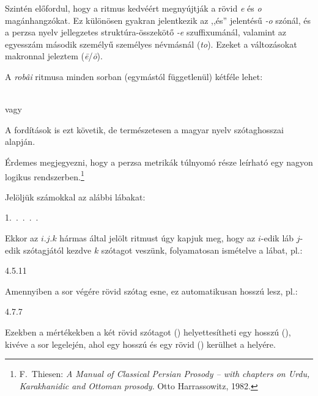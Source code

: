 Szintén előfordul, hogy a ritmus kedvéért megnyújtják a rövid \emph{e}
és \emph{o} magánhangzókat. Ez különösen gyakran jelentkezik az ,,és''
jelentésű \emph{-o} szónál, és a perzsa nyelv jellegzetes
struktúra-összekötő \emph{-e} szuffixumánál, valamint az egyesszám
második személyű személyes névmásnál (\emph{to}). Ezeket a
változásokat makronnal jeleztem (\emph{ē}/\emph{ō}).

A \emph{robâi} ritmusa minden sorban (egymástól függetlenül) kétféle
lehet:
\begin{center}
  {\large\metra{\m\m\mbb\s\m\m\mbb\s\m\m\mbb\s\m\cc}}\\
  vagy\\
  {\large\metra{\m\m\mbb\s\m\b\m\b\s\m\m\mbb\s\m\cc}}
\end{center}

A fordítások is ezt követik, de természetesen a magyar nyelv
szótaghosszai alapján.

\begin{center}
\end{center}

Érdemes megjegyezni, hogy a perzsa metrikák túlnyomó része leírható
egy nagyon logikus rendszerben.\footnote{F.~Thiesen: \emph{A Manual of
    Classical Persian Prosody -- with chapters on Urdu, Karakhanidic
    and Ottoman prosody}. Otto Harrassowitz, 1982.}

Jelöljük számokkal az alábbi lábakat:
\begin{center}
  1.~\metra{\b\m\m}.~\metra{\b\m\m\m}.~\metra{\b\b\m\m}.~\metra{\b\m\b\m\b\b\m\m}.~\metra{\m\m\b\b\m\b\m\b}
\end{center}

Ekkor az $i.j.k$ hármas által jelölt ritmust úgy kapjuk meg, hogy az
$i$-edik láb $j$-edik szótagjától kezdve $k$ szótagot veszünk,
folyamatosan ismételve a lábat, pl.:
\begin{center}
4{.}5{.}11 \metra{\b\b\m\m\s\b\m\b\m\s\b\b\m}
\end{center}

Amennyiben a sor végére rövid szótag esne, ez automatikusan hosszú
lesz, pl.:
\begin{center}
4{.}7{.}7 \metra{\m\m\b\m\b\m\m}
\end{center}

Ezekben a mértékekben a két rövid szótagot (\metra{\b\b})
helyettesítheti egy hosszú (\metra{\m}), kivéve a sor legelején, ahol
egy hosszú és egy rövid (\metra{\m\b}) kerülhet a helyére.

